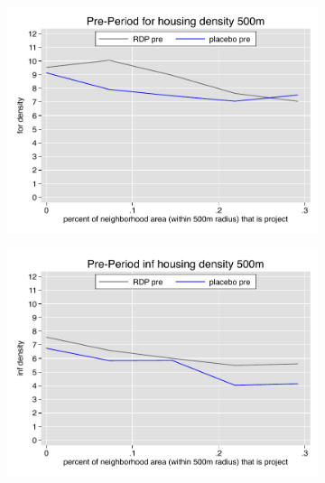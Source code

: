\documentclass[12pt]{article}
\begin{document}
\begin{figure}
        \begin{subfigure}[b]{0.495\textwidth}
            \centering
            \includegraphics[width=\textwidth,trim={0.3cm .3cm 0.1cm 0cm}, clip=true]{figures/overlap_for_500_total_pre.pdf}
        \end{subfigure}
        \hfill
        \begin{subfigure}[b]{0.495\textwidth}  
            \centering 
            \includegraphics[width=\textwidth,trim={0.3cm .3cm 0.1cm 0cm}, clip=true]{figures/overlap_inf_500_total_pre.pdf}
        \end{subfigure}
        \vspace{-6mm}

\end{figure}
\end{document}
